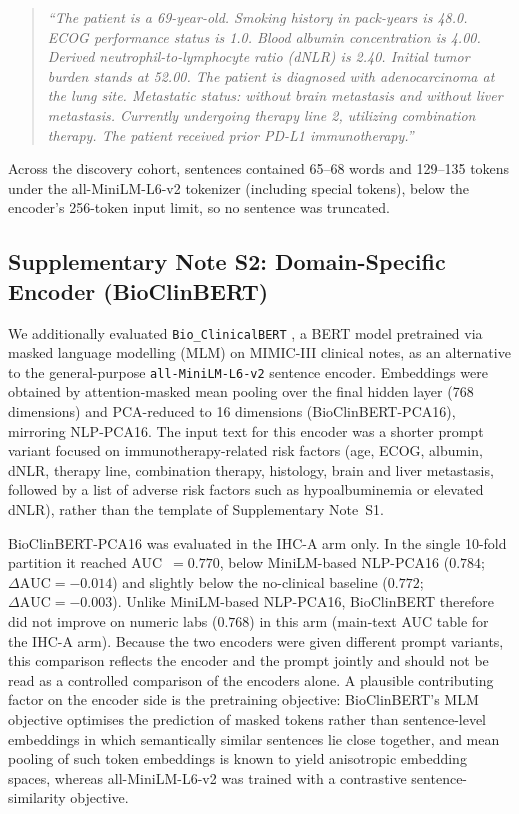 \documentclass[12pt]{article}
\begin{document}
\begin{quote}
\small
\raggedright
\textit{``The patient is a 69-year-old. Smoking history in pack-years is 48.0.
ECOG performance status is 1.0. Blood albumin concentration is 4.00. Derived
neutrophil-to-lymphocyte ratio (dNLR) is 2.40. Initial tumor burden stands
at 52.00. The patient is diagnosed with adenocarcinoma at the lung site.
Metastatic status: without brain metastasis and without liver metastasis.
Currently undergoing therapy line 2, utilizing combination therapy. The
patient received prior PD-L1 immunotherapy.''}
\end{quote}

Across the discovery cohort, sentences contained 65--68 words and 129--135
tokens under the all-MiniLM-L6-v2 tokenizer (including special tokens),
below the encoder's 256-token input limit, so no sentence was truncated.

\subsection*{Supplementary Note S2: Domain-Specific Encoder (BioClinBERT)}
\label{supp:note2}

We additionally evaluated \texttt{Bio\_ClinicalBERT} \cite{Alsentzer2019}, a
BERT model pretrained via masked language modelling (MLM) on MIMIC-III
clinical notes, as an alternative to the general-purpose
\texttt{all-MiniLM-L6-v2} sentence encoder. Embeddings were obtained by
attention-masked mean pooling over the final hidden layer (768 dimensions)
and PCA-reduced to 16 dimensions (BioClinBERT-PCA16), mirroring NLP-PCA16.
The input text for this encoder was a shorter prompt variant focused on
immunotherapy-related risk factors (age, ECOG, albumin, dNLR, therapy line,
combination therapy, histology, brain and liver metastasis, followed by a
list of adverse risk factors such as hypoalbuminemia or elevated dNLR),
rather than the template of Supplementary Note~S1.

BioClinBERT-PCA16 was evaluated in the IHC-A arm only. In the single 10-fold partition it reached AUC~$=0.770$, below
MiniLM-based NLP-PCA16 ($0.784$; $\Delta\text{AUC} = -0.014$) and slightly below the no-clinical baseline ($0.772$;
$\Delta\text{AUC} = -0.003$). Unlike MiniLM-based NLP-PCA16, BioClinBERT therefore did not improve on numeric
labs ($0.768$) in this arm (main-text AUC table for the IHC-A arm).
Because the two encoders were given different prompt variants, this
comparison reflects the encoder and the prompt jointly and should not be read
as a controlled comparison of the encoders alone.
A plausible contributing factor on the encoder side is the pretraining
objective: BioClinBERT's MLM objective optimises the prediction of masked
tokens rather than sentence-level embeddings in which semantically similar
sentences lie close together, and mean pooling of such token embeddings is
known to yield anisotropic embedding spaces, whereas all-MiniLM-L6-v2 was
trained with a contrastive sentence-similarity objective.
\end{document}
